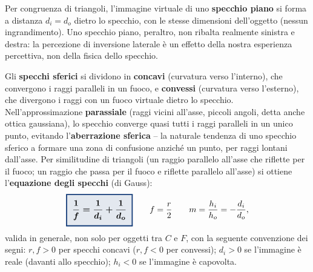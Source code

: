 \documentclass[a4paper,11pt]{article}
\newcommand{\keyeq}[1]{{\setlength{\fboxsep}{6pt}\setlength{\fboxrule}{1.3pt}\fcolorbox{chapblue}{chapblue!12}{\boldmath$\displaystyle #1$}}}
\begin{document}
Per congruenza di triangoli, l'immagine virtuale di uno \textbf{specchio piano} si forma a distanza $d_i=d_o$ dietro lo specchio, con le stesse dimensioni dell'oggetto (nessun ingrandimento). Uno specchio piano, peraltro, non ribalta realmente sinistra e destra: la percezione di inversione laterale è un effetto della nostra esperienza percettiva, non della fisica dello specchio.

Gli \textbf{specchi sferici} si dividono in \textbf{concavi} (curvatura verso l'interno), che convergono i raggi paralleli in un fuoco, e \textbf{convessi} (curvatura verso l'esterno), che divergono i raggi con un fuoco virtuale dietro lo specchio. Nell'approssimazione \textbf{parassiale} (raggi vicini all'asse, piccoli angoli, detta anche ottica gaussiana), lo specchio converge quasi tutti i raggi paralleli in un unico punto, evitando l'\textbf{aberrazione sferica} -- la naturale tendenza di uno specchio sferico a formare una zona di confusione anziché un punto, per raggi lontani dall'asse. Per similitudine di triangoli (un raggio parallelo all'asse che riflette per il fuoco; un raggio che passa per il fuoco e riflette parallelo all'asse) si ottiene l'\textbf{equazione degli specchi} (di Gauss):
\[
\keyeq{\frac{1}{f} = \frac{1}{d_i}+\frac{1}{d_o}} \qquad f = \frac{r}{2} \qquad m = \frac{h_i}{h_o} = -\frac{d_i}{d_o},
\]
valida in generale, non solo per oggetti tra $C$ e $F$, con la seguente convenzione dei segni: $r,f>0$ per specchi concavi ($r,f<0$ per convessi); $d_i>0$ se l'immagine è reale (davanti allo specchio); $h_i<0$ se l'immagine è capovolta.

\begin{center}
\end{center}
\end{document}
